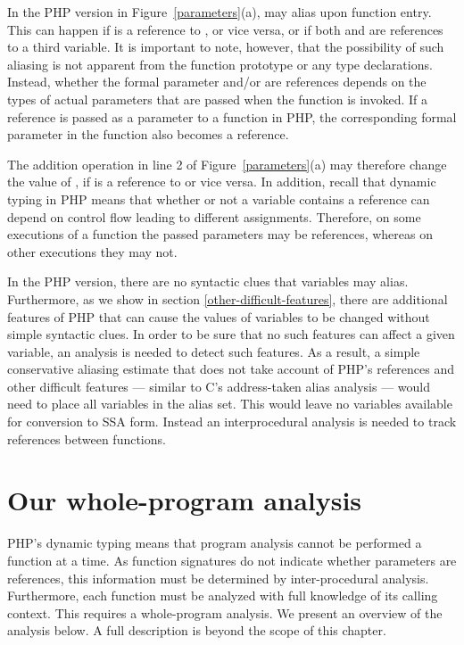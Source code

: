 In the PHP version in Figure~\ref{parameters}(a),  may alias
 upon function entry. This can happen if  is a reference
to , or vice versa, or if both  and  are
references to a third variable. It is important to note, however, that
the possibility of such aliasing is not apparent from the function
prototype or any type declarations. Instead, whether the formal
parameter  and/or  are references depends on the types
of actual parameters that are passed when the function is invoked. If
a reference is passed as a parameter to a function in PHP, the
corresponding formal parameter in the function also becomes a
reference.

The addition operation in line 2 of Figure~\ref{parameters}(a) may
therefore change the value of , if  is a reference to
 or vice versa. In addition, recall that dynamic typing in PHP
means that whether or not a variable contains a reference can depend
on control flow leading to different assignments. Therefore, on some
executions of a function the passed parameters may be references,
whereas on other executions they may not.


In the PHP version, there are no syntactic clues that variables may
alias.  Furthermore, as we show in section
\ref{other-difficult-features}, there are additional features of PHP
that can cause the values of variables to be changed without simple
syntactic clues.  In order to be sure that no such features can affect
a given variable, an analysis is needed to detect such features.  As a
result, a simple conservative aliasing estimate that does not take
account of PHP's references and other difficult features --- similar
to C's address-taken alias analysis --- would need to place all
variables in the alias set.  This would leave no variables available
for conversion to SSA form. Instead an interprocedural analysis is
needed to track references between functions.


\section{Our whole-program analysis}

PHP's dynamic typing means that program analysis cannot be performed a
function at a time.  As function signatures do not indicate whether
parameters are references, this information must be determined by
inter-procedural analysis.  Furthermore, each function must be
analyzed with full knowledge of its calling context.  This requires a
whole-program analysis. We present an overview of the analysis below.
A full description is beyond the scope of this chapter.

